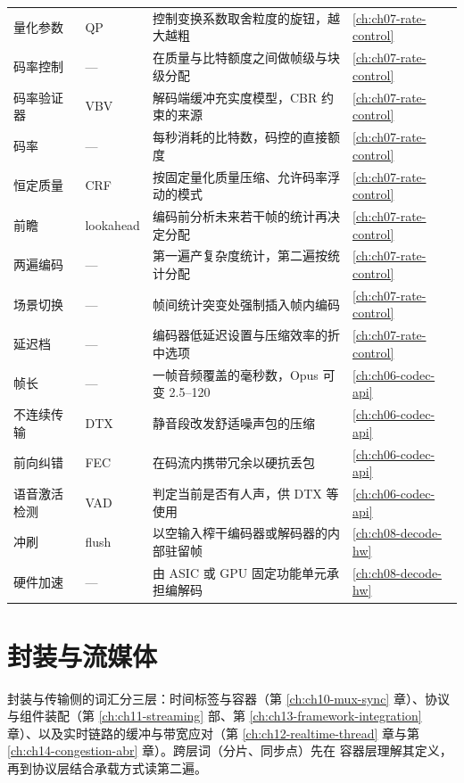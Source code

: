 \documentclass[12pt,a4paper,fontset=fandol]{ctexbook}
\begin{document}
\begin{longtable}{>{\raggedright\arraybackslash}p{} >{\raggedright\arraybackslash}p{} >{\raggedright\arraybackslash}p{} >{\raggedright\arraybackslash}p{}}
量化参数 & QP & 控制变换系数取舍粒度的旋钮，越大越粗 & \ref{ch:ch07-rate-control} \\
码率控制 & — & 在质量与比特额度之间做帧级与块级分配 & \ref{ch:ch07-rate-control} \\
码率验证器 & VBV & 解码端缓冲充实度模型，CBR 约束的来源 & \ref{ch:ch07-rate-control} \\
码率 & — & 每秒消耗的比特数，码控的直接额度 & \ref{ch:ch07-rate-control} \\
恒定质量 & CRF & 按固定量化质量压缩、允许码率浮动的模式 & \ref{ch:ch07-rate-control} \\
前瞻 & lookahead & 编码前分析未来若干帧的统计再决定分配 & \ref{ch:ch07-rate-control} \\
两遍编码 & — & 第一遍产复杂度统计，第二遍按统计分配 & \ref{ch:ch07-rate-control} \\
场景切换 & — & 帧间统计突变处强制插入帧内编码 & \ref{ch:ch07-rate-control} \\
延迟档 & — & 编码器低延迟设置与压缩效率的折中选项 & \ref{ch:ch07-rate-control} \\
帧长 & — & 一帧音频覆盖的毫秒数，Opus 可变 2.5--120 & \ref{ch:ch06-codec-api} \\
不连续传输 & DTX & 静音段改发舒适噪声包的压缩 & \ref{ch:ch06-codec-api} \\
前向纠错 & FEC & 在码流内携带冗余以硬抗丢包 & \ref{ch:ch06-codec-api} \\
语音激活检测 & VAD & 判定当前是否有人声，供 DTX 等使用 & \ref{ch:ch06-codec-api} \\
冲刷 & flush & 以空输入榨干编码器或解码器的内部驻留帧 & \ref{ch:ch08-decode-hw} \\
硬件加速 & — & 由 ASIC 或 GPU 固定功能单元承担编解码 & \ref{ch:ch08-decode-hw} \\
\end{longtable}

\section{封装与流媒体}

封装与传输侧的词汇分三层：时间标签与容器（第
\ref{ch:ch10-mux-sync} 章）、协议与组件装配（第
\ref{ch:ch11-streaming} 部、第 \ref{ch:ch13-framework-integration}
章）、以及实时链路的缓冲与带宽应对（第 \ref{ch:ch12-realtime-thread}
章与第 \ref{ch:ch14-congestion-abr} 章）。跨层词（分片、同步点）先在
容器层理解其定义，再到协议层结合承载方式读第二遍。
\end{document}
